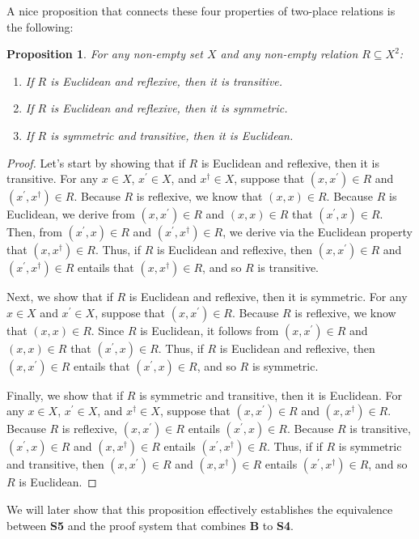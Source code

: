 \documentclass[11pt]{article}
\newtheorem{proposition}[theorem]{Proposition}
\theoremstyle{definition}
\theoremstyle{remark}
\begin{document}
A nice proposition that connects these four properties of two-place relations is the following:
\begin{proposition}
    For any non-empty set $X$ and any non-empty relation $R\subseteq X^{2}$: 
    \begin{enumerate}
        \item If $R$ is Euclidean and reflexive, then it is transitive.

        \item If $R$ is Euclidean and reflexive, then it is symmetric.

        \item If $R$ is symmetric and transitive, then it is Euclidean.
    \end{enumerate}
    
\end{proposition}
\begin{proof}
    Let's start by showing that if $R$ is Euclidean and reflexive, then it is transitive. For any $x\in X$, $x^{\prime}\in X$, and $x^{\dagger}\in X$, suppose that $(x,x^{\prime})\in R$ and $(x^{\prime},x^{\dagger})\in R$. Because $R$ is reflexive, we know that $(x,x)\in R$. Because $R$ is Euclidean, we derive from $(x,x^{\prime})\in R$ and $(x,x)\in R$ that $(x^{\prime},x)\in R$. Then, from $(x^{\prime},x)\in R$ and $(x^{\prime},x^{\dagger})\in R$, we derive via the Euclidean property that $(x,x^{\dagger})\in R$. Thus, if $R$ is Euclidean and reflexive, then $(x,x^{\prime})\in R$ and $(x^{\prime},x^{\dagger})\in R$ entails that $(x,x^{\dagger})\in R$, and so $R$ is transitive.\par

    Next, we show that if $R$ is Euclidean and reflexive, then it is symmetric. For any $x\in X$ and $x^{\prime}\in X$, suppose that $(x,x^{\prime})\in R$. Because $R$ is reflexive, we know that $(x,x)\in R$. Since $R$ is Euclidean, it follows from $(x,x^{\prime})\in R$ and $(x,x)\in R$ that $(x^{\prime},x)\in R$. Thus, if $R$ is Euclidean and reflexive, then $(x,x^{\prime})\in R$ entails that $(x^{\prime},x)\in R$, and so $R$ is symmetric.\par

    Finally, we show that if $R$ is symmetric and transitive, then it is Euclidean. For any $x\in X$, $x^{\prime}\in X$, and $x^{\dagger}\in X$, suppose that $(x,x^{\prime})\in R$ and $(x,x^{\dagger})\in R$. Because $R$ is reflexive, $(x,x^{\prime})\in R$ entails $(x^{\prime},x)\in R$. Because $R$ is transitive, $(x^{\prime},x)\in R$ and $(x,x^{\dagger})\in R$ entails $(x^{\prime},x^{\dagger})\in R$. Thus, if if $R$ is symmetric and transitive, then $(x,x^{\prime})\in R$ and $(x,x^{\dagger})\in R$ entails $(x^{\prime},x^{\dagger})\in R$, and so $R$ is Euclidean. 
\end{proof}
\noindent
We will later show that this proposition effectively establishes the equivalence between \textbf{S5} and the proof system that combines \textbf{B} to \textbf{S4}.
\end{document}
